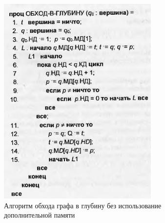 \begin{figure}[h!]
    \centering
    \includegraphics[width=0.4\linewidth]{ResearchNotes/rndhpc_int_edt_2023_01_10/without_memory.png}
    \caption{Алгоритм обхода графа в глубину без использование дополнительной памяти}
    \label{fig:without_memory}
\end{figure}

\noteattributes{}